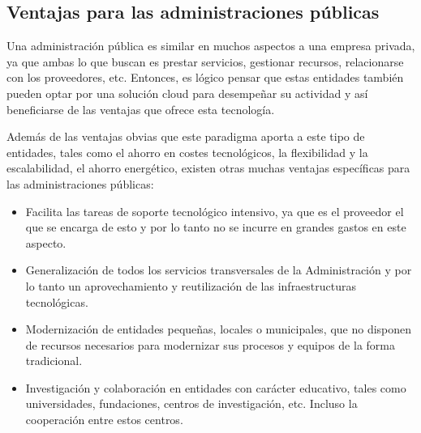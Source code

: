 \documentclass[a4paper, 12pt]{report}
\begin{document}
\subsection{Ventajas para las administraciones p\'ublicas}
\begin{justify}
Una administraci\'on p\'ublica es similar en muchos aspectos a una empresa privada, ya que ambas lo que buscan es prestar servicios, gestionar recursos, relacionarse con los proveedores, etc. Entonces, es lógico pensar que estas entidades tambi\'en pueden optar por una soluci\'on cloud para desempeñar su actividad y as\'i beneficiarse de las ventajas que ofrece esta tecnolog\'ia.

Adem\'as de las ventajas obvias que este paradigma aporta a este tipo de entidades, tales como el ahorro en costes tecnol\'ogicos, la flexibilidad y la escalabilidad, el ahorro energ\'etico, existen otras muchas ventajas espec\'ificas para las administraciones p\'ublicas:
				\begin{itemize}
						\item{}Facilita las tareas de soporte tecnol\'ogico intensivo, ya que es el proveedor el que se encarga de esto y por lo tanto no se incurre en grandes gastos en este aspecto.
						\item{}Generalizaci\'on de todos los servicios transversales de la Administraci\'on y por lo tanto un aprovechamiento y reutilizaci\'on de las infraestructuras tecnol\'ogicas.
						\item{}Modernizaci\'on de entidades pequeñas, locales o municipales, que no disponen
de recursos necesarios para modernizar sus procesos y equipos de la forma tradicional.
						\item{}Investigaci\'on y colaboraci\'on en entidades con car\'acter educativo, tales como universidades, fundaciones, centros de investigaci\'on, etc. Incluso la cooperaci\'on entre estos centros.
				\end{itemize}
\end{justify}
\newpage
\end{document}
